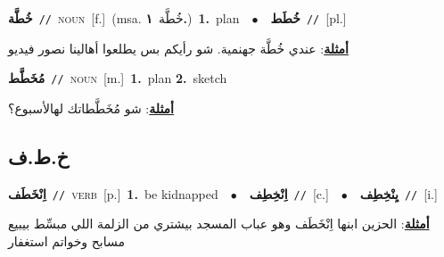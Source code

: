 \documentclass[10pt,a4paper,twoside]{article} %
\begin{document}
\begin{multicols}{2}
{\setlength\topsep{0pt}\textbf{\foreignlanguage{arabic}{خُطَّة}}\ {\color{gray}\texttt{//}\color{black}}\ \textsc{noun}\ [f.]\ \color{gray}(msa. \foreignlanguage{arabic}{خُطَّة}~\foreignlanguage{arabic}{\textbf{١.}})\color{black}\ \textbf{1.}~plan\ \ $\bullet$\ \ \setlength\topsep{0pt}\textbf{\foreignlanguage{arabic}{خُطَط}}\ {\color{gray}\texttt{//}\color{black}}\ [pl.]\  \begin{flushright}\color{gray}\foreignlanguage{arabic}{\textbf{\underline{\foreignlanguage{arabic}{أمثلة}}}: عندي خُطَّة جهنمية. شو رأيكم بس يطلعوا أهالينا نصور فيديو}\end{flushright}\color{black}} \vspace{2mm}

{\setlength\topsep{0pt}\textbf{\foreignlanguage{arabic}{مُخَطَّط}}\ {\color{gray}\texttt{//}\color{black}}\ \textsc{noun}\ [m.]\ \textbf{1.}~plan  \textbf{2.}~sketch\  \begin{flushright}\color{gray}\foreignlanguage{arabic}{\textbf{\underline{\foreignlanguage{arabic}{أمثلة}}}: شو مُخَطَّطاتك لهالأسبوع؟}\end{flushright}\color{black}} \vspace{2mm}

\vspace{-3mm}
\subsection*{\color{blue}\foreignlanguage{arabic}{خ.ط.ف}\color{blue}{}} 

{\setlength\topsep{0pt}\textbf{\foreignlanguage{arabic}{اِنْخَطَف}}\ {\color{gray}\texttt{//}\color{black}}\ \textsc{verb}\ [p.]\ \textbf{1.}~be kidnapped\ \ $\bullet$\ \ \setlength\topsep{0pt}\textbf{\foreignlanguage{arabic}{اِنْخِطِف}}\ {\color{gray}\texttt{//}\color{black}}\ [c.]\ \ $\bullet$\ \ \setlength\topsep{0pt}\textbf{\foreignlanguage{arabic}{يِنْخِطِف}}\ {\color{gray}\texttt{//}\color{black}}\ [i.]\  \begin{flushright}\color{gray}\foreignlanguage{arabic}{\textbf{\underline{\foreignlanguage{arabic}{أمثلة}}}: الحزين ابنها اِنْخَطَف وهو عباب المسجد بيشتري من الزلمة اللي مبسِّط بيبيع مسابح وخواتم استغفار}\end{flushright}\color{black}} \vspace{2mm}


\end{multicols}
\end{document}
